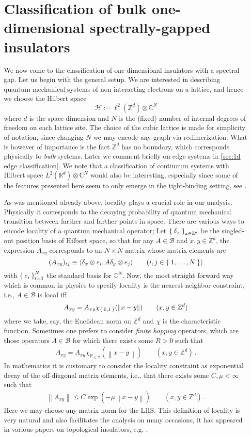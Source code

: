 \documentclass[a4paper,10pt]{article}
\numberwithin{equation}{section}
\theoremstyle{plain}
\theoremstyle{plain}
\theoremstyle{plain}
\theoremstyle{plain}
\theoremstyle{plain}
\theoremstyle{remark}
\theoremstyle{definition}
\theoremstyle{plain}
\newcommand{\ZZ}{\mathbb{Z}}
\newcommand{\RR}{\mathbb{R}}
\newcommand{\CC}{\mathbb{C}}
\newcommand{\calB}{\mathcal{B}}
\newcommand{\calH}{\mathcal{H}}
\newcommand\norm[1]{\left\lVert#1\right\rVert}
\newcommand{\ip}[2]{\langle #1, #2 \rangle}
\newcommand{\eq}[1]{\begin{align*}#1\end{align*}}
\newcommand{\eql}[1]{\begin{align}#1\end{align}}
\begin{document}
	
	
	
	\section{Classification of bulk one-dimensional spectrally-gapped insulators}\label{sec:bulk insulators classification}
	We now come to the classification of one-dimensional insulators with a spectral gap. Let us begin with the general setup. We are interested in describing quantum mechanical systems of non-interacting electrons on a lattice, and hence we choose the Hilbert space $$ \calH := \ell^2(\ZZ^d)\otimes\CC^N $$ where $d$ is the space dimension and $N$ is the (fixed) number of internal degrees of freedom on each lattice site. The choice of the cubic lattice is made for simplicity of notation, since changing $N$ we may encode any graph via redimerization. What is however of importance is the fact $\ZZ^d$ has no boundary, which corresponds physically to \emph{bulk} systems. Later we comment briefly on edge systems in \cref{sec:1d edge classification}. We note that a classification of continuum systems with Hilbert space $L^2(\RR^d)\otimes\CC^N$ would also be interesting, especially since some of the features presented here seem to only emerge in the tight-binding setting,  see  \cite{ShapiroWeinstein2020,ShapiroWeinstein2022}.
	
	As was mentioned already above, locality plays a crucial role in our analysis. Physically it corresponds to the decaying probability of quantum mechanical transition between farther and farther points in space. There are various ways to encode locality of a quantum mechanical operator; Let $\Set{\delta_x}_{x\in\ZZ^d}$ be the singled-out position basis of Hilbert space, so that for any $A\in\calB$ and $x,y\in\ZZ^d$, the expression $A_{xy}$ corresponds to an $N\times N$ matrix whose matrix elements are $$ (A_{xy})_{ij} \equiv \ip{\delta_x\otimes e_i}{A \delta_y \otimes e_j}\qquad(i,j\in\Set{1,\dots,N}) $$  with $\Set{e_i}_{i=1}^N$ the standard basis for $\CC^N$. Now, the most straight forward way which is common in physics to specify locality is the nearest-neighbor constraint, i.e., $A\in\calB$ is local iff $$ A_{xy} = A_{xy}\chi_{\Set{0,1}}(\norm{x-y}) \qquad(x,y\in\ZZ^d)$$ where we take, say, the Euclidean norm on $\ZZ^d$ and $\chi$ is the characteristic function. Sometimes one prefers to consider \emph{finite hopping} operators, which are those operators $A\in\calB$ for which there exists some $R>0$ such that \eq{A_{xy} = A_{xy}\chi_{\RR_{\leq R}}(\norm{x-y}) \qquad(x,y\in\ZZ^d)\,.} In mathematics it is customary to consider the locality constraint as exponential decay of the off-diagonal matrix elements, i.e., that there exists some $C,\mu<\infty$ such that \eql{\label{eq:exp locality} \norm{A_{xy}}\leq C \exp\left(-\mu\norm{x-y}\right)\qquad(x,y\in\ZZ^d)\,. } Here we may choose any matrix norm for the LHS. This definition of locality is very natural and also facilitates the analysis on many occasions, it has appeared in various papers on topological insulators, e.g. \cite{EGS_2005,Shapiro20,FSSWY22,BSS23,Shapiro2019}.
	
\end{document}
